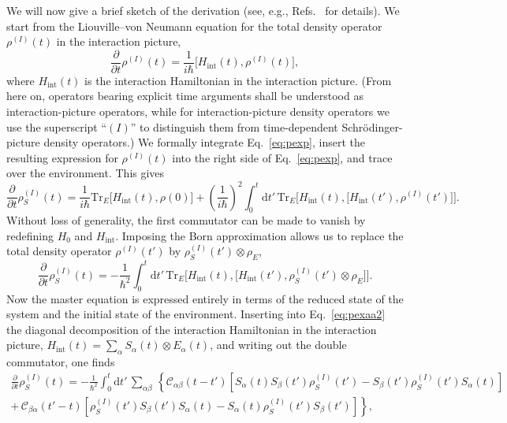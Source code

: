 \documentclass[3p,sort&compress]{elsarticle}
\newcommand{\D}{\ensuremath{\mathrm{d}}}
\newcommand{\I}{\ensuremath{i}}
\newcommand{\op}[1]{#1}
\begin{document}
We will now give a brief sketch of the derivation (see, e.g., Refs.~\cite{Breuer:2002:oq,Schlosshauer:2007:un} for details). We start from the Liouville--von Neumann equation for the total density operator $\op{\rho}^{(I)}(t)$ in the interaction picture,
%
\begin{equation}
  \label{eq:pexp}
  \frac{\partial}{\partial t} \op{\rho}^{(I)}(t) = \frac{1}{\I \hbar} \bigl[
    \op{H}_\text{int}(t),  \op{\rho}^{(I)}(t) \bigr],
\end{equation}
%
where $\op{H}_\text{int}(t)$ is the interaction Hamiltonian in the interaction picture. (From here on, operators bearing explicit time arguments shall be understood as interaction-picture operators, while for interaction-picture density operators we use the superscript ``$(I)$'' to distinguish them from time-dependent Schr\"odinger-picture density operators.)  We formally integrate Eq.~\eqref{eq:pexp}, insert the resulting expression for $\op{\rho}^{(I)}(t)$ into the right side of Eq.~\eqref{eq:pexp}, and trace over the environment. This gives
%
\begin{equation} 
\label{eq:pexps2} 
\frac{\partial}{\partial t}
  \op{\rho}^{(I)}_S(t) = \frac{1}{\I \hbar}\text{Tr}_E \bigl[ \op{H}_\text{int}(t), \op{\rho}(0) \bigr] + \left(\frac{1}{\I \hbar}\right)^2 \int_0^t \D t'
  \, \text{Tr}_E \bigl[ \op{H}_\text{int}(t), \bigl[
      \op{H}_\text{int}(t'), \op{\rho}^{(I)}(t') \bigr]
  \bigr].
\end{equation}
%
Without loss of generality, the first commutator can be made to vanish by redefining $\op{H}_0$ and $\op{H}_\text{int}$. Imposing the Born approximation allows us to replace the total density operator $\op{\rho}^{(I)}(t')$ by $\op{\rho}^{(I)}_S(t') \otimes  \op{\rho}_E$,
%
\begin{equation} 
\label{eq:pexaa2} 
\frac{\partial}{\partial t}
\op{\rho}^{(I)}_S(t) = -\frac{1}{\hbar^2} \int_0^t \D t'
\, \text{Tr}_E \bigl[ \op{H}_\text{int}(t), \bigl[
    \op{H}_\text{int}(t'),  \op{\rho}^{(I)}_S(t') \otimes
    \op{\rho}_E \bigr]
\bigr].
\end{equation}
%
Now the master equation is expressed entirely in  terms of the reduced state of the system and the initial state of the environment. Inserting into Eq.~\eqref{eq:pexaa2}  the diagonal decomposition of the interaction Hamiltonian in the interaction picture, $\op{H}_\text{int}(t) =\sum_\alpha \op{S}_\alpha(t) \otimes \op{E}_\alpha(t)$,  and writing out the double commutator, one finds
%
\begin{multline} 
\label{eq:pexa51} 
\frac{\partial}{\partial t}
\op{\rho}^{(I)}_S(t) =  - \frac{1}{\hbar^2}\int_0^t \D t'
\, \sum_{\alpha\beta} \, \left\{ \mathcal{C}_{\alpha\beta}(t-t') \left[
    \op{S}_\alpha(t) \op{S}_\beta(t') \op{\rho}^{(I)}_S(t')
    - \op{S}_\beta(t') \op{\rho}^{(I)}_S(t') \op{S}_\alpha(t)
  \right] \right. \\  \left. + \, \mathcal{C}_{\beta\alpha}(t'-t) \left[
    \op{\rho}^{(I)}_S(t')\op{S}_\beta(t')  \op{S}_\alpha(t)
    - \op{S}_\alpha(t)\op{\rho}^{(I)}_S(t')\op{S}_\beta(t')
  \right] \right\},
\end{multline}
\end{document}
